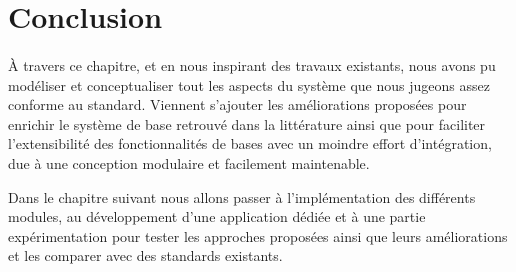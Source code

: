 \section{Conclusion}
\paragraph{}
À travers ce chapitre, et en nous inspirant des travaux existants, nous avons pu modéliser et conceptualiser tout les aspects du système que nous jugeons assez conforme au standard. Viennent s'ajouter les améliorations proposées pour enrichir le système de base retrouvé dans la littérature ainsi que pour faciliter l'extensibilité des fonctionnalités de bases avec un moindre effort d'intégration, due à une conception modulaire et facilement maintenable. 
\par Dans le chapitre suivant nous allons passer à l'implémentation des différents modules, au développement d'une application dédiée et à une partie expérimentation pour tester les approches proposées ainsi que leurs améliorations et les comparer avec des standards existants.



% 
% 

